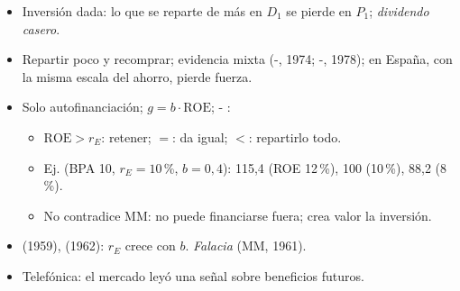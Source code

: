 \documentclass{article}
\begin{document}
\begin{columnas}
\begin{itemize}
\item Inversión dada: lo que se reparte de más en $D_1$ se pierde en $P_1$; \emph{dividendo casero}.
\end{itemize}
\begin{itemize}
\item Repartir poco y recomprar; evidencia mixta (-, 1974; -, 1978); en España, con la misma escala del ahorro, pierde fuerza.
\end{itemize}
\begin{itemize}
\item Solo autofinanciación; $g=b\cdot\mathrm{ROE}$; - :
  \begin{itemize}
  \item $\mathrm{ROE}>r_E$: retener; $=$: da igual; $<$: repartirlo todo.
  \item Ej. (BPA 10, $r_E=10$\,\%, $b=0{,}4$): 115,4 (ROE 12\,\%), 100 (10\,\%), 88,2 (8\,\%).
  \item No contradice MM: no puede financiarse fuera; crea valor la inversión.
  \end{itemize}
\end{itemize}
\begin{itemize}
\item {} (1959),  (1962): $r_E$ crece con $b$. \emph{Falacia} (MM, 1961).
\item Telefónica: el mercado leyó una señal sobre beneficios futuros.
\end{itemize}


\end{columnas}
\end{document}
